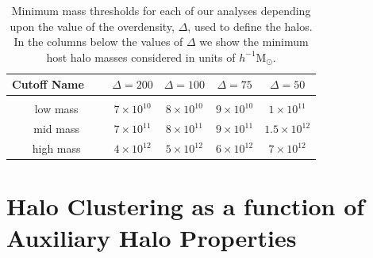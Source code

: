 \documentclass[usenatbib,usegraphicx,letterpaper]{mn2e}
\begin{document}
\begin{table}
\caption{
Minimum mass thresholds for each of our analyses depending upon the 
value of the overdensity, $\Delta$, used to define the halos. 
In the columns below the values of $\Delta$ we show the minimum 
host halo masses considered in units of $h^{-1}\mathrm{M}_{\odot}$.
}
\vspace*{8pt}
\begin{tabular}{ c c c c c }
\hline
\hline
Cutoff Name \ \  & $\Delta=200$ & $\Delta=100$ & $\Delta=75$ & $\Delta=50$ \\
\hline
\\{low mass} & $7 \times 10^{10}$ & $8 \times 10^{10}$ & $9 \times 10^{10}$ & $1 \times 10^{11}$  \\
{mid mass} & $7 \times 10^{11}$ & $8 \times 10^{11}$ & $9 \times 10^{11}$ & $1.5 \times 10^{12}$ \\
{high mass} & $4 \times 10^{12}$ & $5 \times 10^{12}$ & $6 \times 10^{12}$ & $7 \times 10^{12}$ \\
\hline
\hline
\end{tabular}
\label{table:thresholds}
\end{table}


\section[]{Halo Clustering as a function of Auxiliary Halo Properties}
\label{section:methodology}
\end{document}
